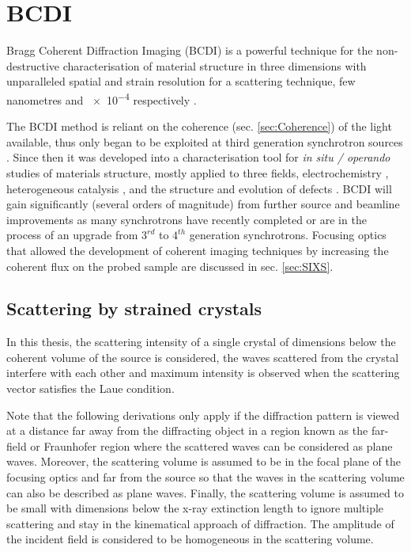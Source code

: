 \section{BCDI} \label{sec:BCDI}

Bragg Coherent Diffraction Imaging (BCDI) \parencite{Robinson2001, Robinson2009} is a powerful technique for the non-destructive characterisation of material structure in three dimensions with unparalleled spatial and strain resolution for a scattering technique, few nanometres \parencite{Labat2015, Cherukara2018a} and \num{e-4} respectively \parencite{Newton2010, Lauraux2020}.

The BCDI method is reliant on the coherence (sec. \ref{sec:Coherence}) of the light available, thus only began to be exploited at third generation synchrotron sources \parencite{Miao1999, Miao2000, Robinson2001, Labat2007, Robinson2009, Vaxelaire2010, Chamard2010, Clark2012, Clark2013, Yang2013, Xiong2014}.
Since then it was developed into a characterisation tool for \textit{in situ / operando} studies of materials structure, mostly applied to three fields, electrochemistry \parencite{Ulvestad2015}, heterogeneous catalysis \parencite{Ulvestad2016}, and the structure and evolution of defects \parencite{Labat2015}.
BCDI will gain significantly (several orders of magnitude) from further source and beamline improvements as many synchrotrons have recently completed or are in the process of an upgrade from $3^{rd}$ to $4^{th}$ generation synchrotrons.
Focusing optics that allowed the development of coherent imaging techniques by increasing the coherent flux on the probed sample are discussed in sec. \ref{sec:SIXS}.

\subsection{Scattering by strained crystals}\label{sec:StrainBCDI}

In this thesis, the scattering intensity of a single crystal of dimensions below the coherent volume of the source is considered, the waves scattered from the crystal interfere with each other and maximum intensity is observed when the scattering vector satisfies the Laue condition.

Note that the following derivations only apply if the diffraction pattern is viewed at a distance far away from the diffracting object in a region known as the far-field or Fraunhofer region \parencite{Willmott} where the scattered waves can be considered as plane waves.
Moreover, the scattering volume is assumed to be in the focal plane of the focusing optics and far from the source so that the waves in the scattering volume can also be described as plane waves.
Finally, the scattering volume is assumed to be small with dimensions below the x-ray extinction length to ignore multiple scattering and stay in the kinematical approach of diffraction.
The amplitude of the incident field is considered to be homogeneous in the scattering volume.

